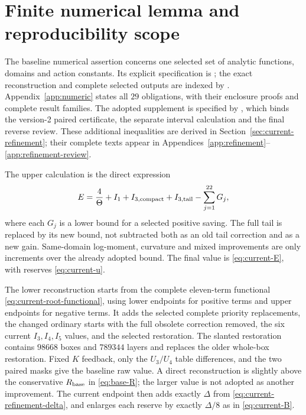\section{Finite numerical lemma and reproducibility scope}
\label{sec:current-numeric}

The baseline numerical assertion concerns one selected set of
analytic functions, domains and action constants.  Its explicit
specification is
;
the exact reconstruction and complete selected outputs are indexed by
.
Appendix~\ref{app:numeric} states all $29$ obligations, with their
enclosure proofs and complete result families.  The adopted supplement
is specified by
,
which binds the version-2 paired certificate, the separate interval
calculation and the final reverse review.  These additional inequalities
are derived in Section~\ref{sec:current-refinement}; their complete
texts appear in Appendices~\ref{app:refinement}--\ref{app:refinement-review}.

The upper calculation is the direct expression
\[
 E=\frac4\Theta+I_1+I_{3,\rm compact}+I_{3,\rm tail}
                         -\sum_{j=1}^{22}G_j,
\]
where each $G_j$ is a lower bound for a selected positive saving.
The full tail is replaced by its new bound, not subtracted both as
an old tail correction and as a new gain.  Same-domain log-moment,
curvature and mixed improvements are only increments over the
already adopted bound.  The final value is
\eqref{eq:current-E}, with reserves \eqref{eq:current-u}.

The lower reconstruction starts from the complete eleven-term
functional \eqref{eq:current-root-functional}, using lower endpoints
for positive terms and upper endpoints for negative terms.  It adds
the selected complete priority replacements, the changed ordinary
starts with the full obsolete correction removed, the six current
$I_3,I_4,I_5$ values, and the selected restoration.  The slanted
restoration contains $98668$ boxes and $789344$ layers and replaces
the older whole-box restoration.  Fixed $K$ feedback, only the
$U_3/U_4$ table differences, and the two paired masks give the
baseline raw value.  A direct reconstruction is slightly above the
conservative $R_{\rm base}$ in \eqref{eq:base-R}; the larger value is
not adopted as another improvement.  The current endpoint then adds
exactly $\Delta$ from \eqref{eq:current-refinement-delta}, and enlarges
each reserve by exactly $\Delta/8$ as in \eqref{eq:current-B}.

